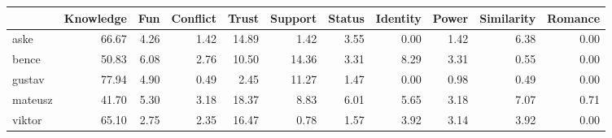 \begin{tabular}{lrrrrrrrrrr}
\toprule
{} &  Knowledge &   Fun &  Conflict &  Trust &  Support &  Status &  Identity &  Power &  Similarity &  Romance \\
\midrule
aske    &      66.67 &  4.26 &      1.42 &  14.89 &     1.42 &    3.55 &      0.00 &   1.42 &        6.38 &     0.00 \\
bence   &      50.83 &  6.08 &      2.76 &  10.50 &    14.36 &    3.31 &      8.29 &   3.31 &        0.55 &     0.00 \\
gustav  &      77.94 &  4.90 &      0.49 &   2.45 &    11.27 &    1.47 &      0.00 &   0.98 &        0.49 &     0.00 \\
mateusz &      41.70 &  5.30 &      3.18 &  18.37 &     8.83 &    6.01 &      5.65 &   3.18 &        7.07 &     0.71 \\
viktor  &      65.10 &  2.75 &      2.35 &  16.47 &     0.78 &    1.57 &      3.92 &   3.14 &        3.92 &     0.00 \\
\bottomrule
\end{tabular}
